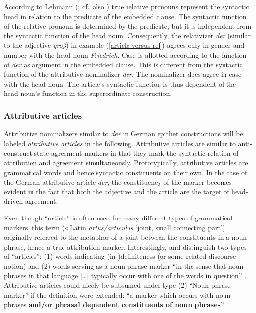 According to Lehmann (\citeyear[230–231]{lehmann1984}; cf.~also \citealt[181]{himmelmann1997}) true relative pronouns represent the syntactic head in relation to the predicate of the embedded clause. The syntactic function of the relative pronoun is determined by the predicate, but it is independent from the syntactic function of the head noun. Consequently, the relativizer \textit{der} (similar to the adjective \textit{groß}) in example (\ref{article versus rel}) agrees only in gender and number with the head noun \textit{Friedrich}. Case is allotted according to the function of \textit{der} as argument in the embedded clause. This is different from the syntactic function of the attributive nominalizer \textit{der}. The nominalizer does agree in case with the head noun. The article's syntactic function is thus dependent of the head noun's function in the superordinate construction.

\subsubsection{Attributive articles} \label{attr art}
Attributive nominalizers similar to \textit{der} in German epithet constructions will be labeled \emph{attributive articles} in the following. Attributive articles are similar to anti\hyp{}construct state agreement markers in that they mark the syntactic relation of attribution and agreement simultaneously. Prototypically, attributive articles are grammatical words and hence syntactic constituents on their own. In the case of the German attributive article \textit{der}, the constituency of the marker becomes evident in the fact that both the adjective and the article are the target of head\hyp{}driven agreement.

Even though “article” is often used for many different types of grammatical markers, this term (<Latin \emph{artus\slash{}articulus} ‘joint, small connecting part’) originally referred to the metaphor of a joint between the constituents in a noun phrase, hence a true attribution marker. Interestingly, \citet[83]{dryer1989a} and \citet{rijkhoff2002} distinguish two types of “articles”: (1) words indicating (in-)definiteness (or some related discourse notion) and (2) words serving as a noun phrase marker “in the sense that noun phrases in that language [\dots] typically occur with one of the words in question” \citep[285]{rijkhoff2002}. Attributive articles could nicely be subsumed under type (2) “Noun phrase marker” if the definition were extended: “a marker which occurs with noun phrases \textbf{and\slash{}or phrasal dependent constituents of noun phrases}”.

